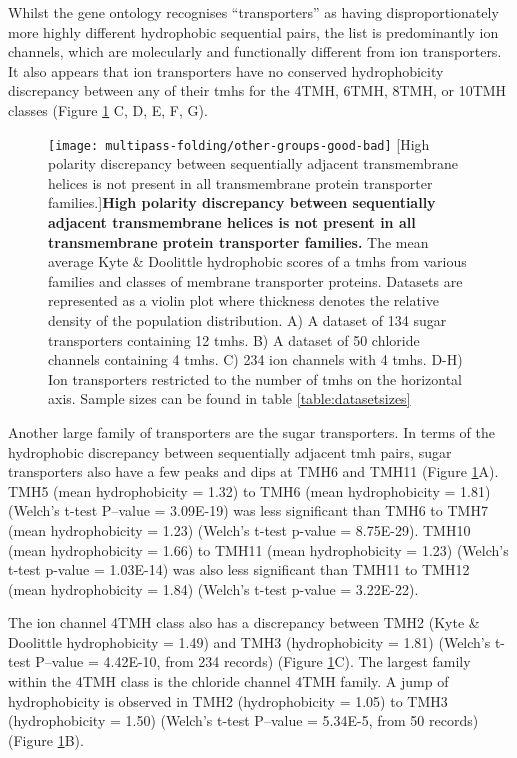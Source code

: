 Whilst the gene ontology recognises ``transporters'' as having disproportionately more highly different hydrophobic sequential pairs, the list is predominantly ion channels, which are molecularly and functionally different from ion transporters.
It also appears that ion transporters have no conserved hydrophobicity discrepancy between any of their \gls{tmh}s for the 4TMH, 6TMH, 8TMH, or 10TMH classes (Figure \ref{fig:other-groups-good-bad} C, D, E, F, G).

\begin{figure}[!ht]
\centering
\texttt{[image: multipass-folding/other-groups-good-bad]}
		[High polarity discrepancy between sequentially adjacent transmembrane helices is not present in all transmembrane protein transporter families.]{\textbf{High polarity discrepancy between sequentially adjacent transmembrane helices is not present in all transmembrane protein transporter families.}
    The mean average Kyte \& Doolittle hydrophobic scores of a \gls{tmh}s from various families and classes of membrane transporter proteins.
    Datasets are represented as a violin plot where thickness denotes the relative density of the population distribution.
    A) A dataset of  134 sugar transporters containing 12 \gls{tmh}s.
    B) A dataset of 50 chloride channels containing 4 \gls{tmh}s.
    C) 234 ion channels with 4 \gls{tmh}s.
    D-H) Ion transporters restricted to the number of \gls{tmh}s on the horizontal axis.
    Sample sizes can be found in table \ref{table:datasetsizes}}

\label{fig:other-groups-good-bad}
\end{figure}

Another large family of transporters are the sugar transporters.
In terms of the hydrophobic discrepancy between sequentially adjacent \gls{tmh} pairs, sugar transporters also have a few peaks and dips at TMH6 and TMH11 (Figure \ref{fig:other-groups-good-bad}A).
TMH5 (mean hydrophobicity = 1.32) to TMH6 (mean hydrophobicity = 1.81) (Welch's t\--test P\---value = 3.09E-19) was less significant than TMH6 to TMH7 (mean hydrophobicity = 1.23) (Welch's t\--test p\--value = 8.75E-29).
TMH10 (mean hydrophobicity = 1.66) to TMH11 (mean hydrophobicity = 1.23) (Welch's t\--test p\--value = 1.03E-14) was also less significant than TMH11 to TMH12 (mean hydrophobicity = 1.84) (Welch's t\--test p\--value = 3.22E-22).

The ion channel 4TMH class also has a discrepancy between TMH2 (Kyte \& Doolittle hydrophobicity = 1.49) and TMH3 (hydrophobicity = 1.81) (Welch's t\--test P\---value = 4.42E-10, from 234 records) (Figure \ref{fig:other-groups-good-bad}C).
The largest family within the 4TMH class is the chloride channel 4TMH family.
A jump of hydrophobicity is observed in TMH2 (hydrophobicity = 1.05) to TMH3 (hydrophobicity = 1.50) (Welch's t\--test P\---value = 5.34E-5, from 50 records) (Figure \ref{fig:other-groups-good-bad}B).

